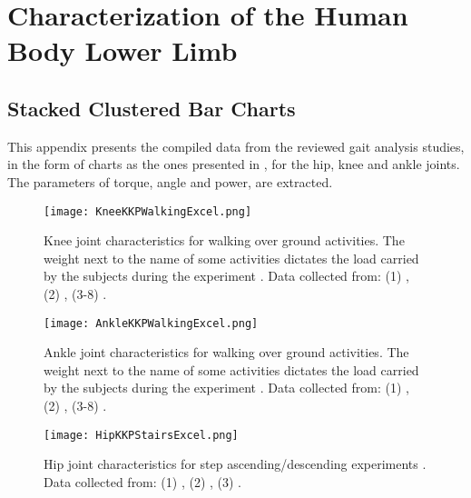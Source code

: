 
\chapter{Characterization of the Human Body Lower Limb} \label{appendixA}
\section{Stacked Clustered Bar Charts}
This appendix presents the compiled data from the reviewed gait analysis studies, in the form of charts as the ones presented in , for the hip, knee and ankle joints. The parameters of torque, angle and power, are extracted.

\begin{figure}[htbp]
\centering
    \texttt{[image: KneeKKPWalkingExcel.png]}
    \caption[Knee joint characteristics for walking over ground activities. The weight next to the name of some activities dictates the load carried by the subjects during the experiment.]{Knee joint characteristics for walking over ground activities. The weight next to the name of some activities dictates the load carried by the subjects during the experiment \cite{solis2017characterization}. Data collected from: (1) \cite{bovi2011multiple}, (2) \cite{lee2008biomechanics}, (3-8) \cite{han2011biomechanical}.}
    \label{fig:kneeKKPWalking}
\end{figure}

\begin{figure}[htbp]
\centering
    \texttt{[image: AnkleKKPWalkingExcel.png]}
    \caption[Ankle joint characteristics for walking over ground activities. The weight next to the name of some activities dictates the load carried by the subjects during the experiment.]{Ankle joint characteristics for walking over ground activities. The weight next to the name of some activities dictates the load carried by the subjects during the experiment \cite{solis2017characterization}. Data collected from: (1) \cite{bovi2011multiple}, (2) \cite{lee2008biomechanics}, (3-8) \cite{han2011biomechanical}.}
    \label{fig:ankleKKPWalking}
\end{figure}

\begin{figure}[htbp]
    \centering
    \texttt{[image: HipKKPStairsExcel.png]}
    \caption[Hip joint characteristics for step ascending/descending experiments.]{Hip joint characteristics for step ascending/descending experiments \cite{solis2017characterization}. Data collected from: (1) \cite{protopapadaki2007hip}, (2) \cite{riener2002stair}, (3) \cite{reid2007knee}. }
    \label{fig:hipKKPStairs}
\end{figure}


